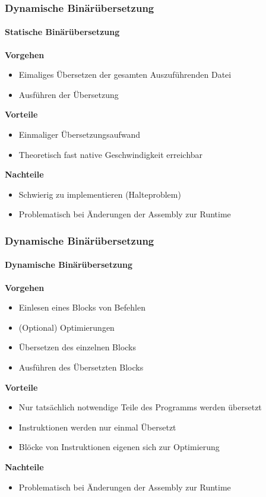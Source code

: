 \begin{frame}
    \frametitle{Dynamische Binärübersetzung}
    \framesubtitle{Statische Binärübersetzung}

    \textbf{Vorgehen}
    \begin{itemize}
        \item Eimaliges Übersetzen der gesamten Auszuführenden Datei
        \item Ausführen der Übersetzung
    \end{itemize}

    \vspace{0.50cm}

    \textbf{Vorteile}
    \begin{itemize}
        \item Einmaliger Übersetzungsaufwand
        \item Theoretisch fast native Geschwindigkeit erreichbar
    \end{itemize}

    \vspace{0.50cm}

    \textbf{Nachteile}
    \begin{itemize}
        \item Schwierig zu implementieren (Halteproblem)
        \item Problematisch bei Änderungen der Assembly zur Runtime
    \end{itemize}
\end{frame}

\begin{frame}
    \frametitle{Dynamische Binärübersetzung}
    \framesubtitle{Dynamische Binärübersetzung}

    \textbf{Vorgehen}
    \begin{itemize}
        \item Einlesen eines Blocks von Befehlen
        \item (Optional) Optimierungen
        \item Übersetzen des einzelnen Blocks
        \item Ausführen des Übersetzten Blocks
    \end{itemize}

    \vspace{0.50cm}

    \textbf{Vorteile}
    \begin{itemize}
        \item Nur tatsächlich notwendige Teile des Programms werden übersetzt
        \item Instruktionen werden nur einmal Übersetzt
        \item Blöcke von Instruktionen eigenen sich zur Optimierung
    \end{itemize}

    \vspace{0.50cm}

    \textbf{Nachteile}
    \begin{itemize}
        \item Problematisch bei Änderungen der Assembly zur Runtime
    \end{itemize}
\end{frame}